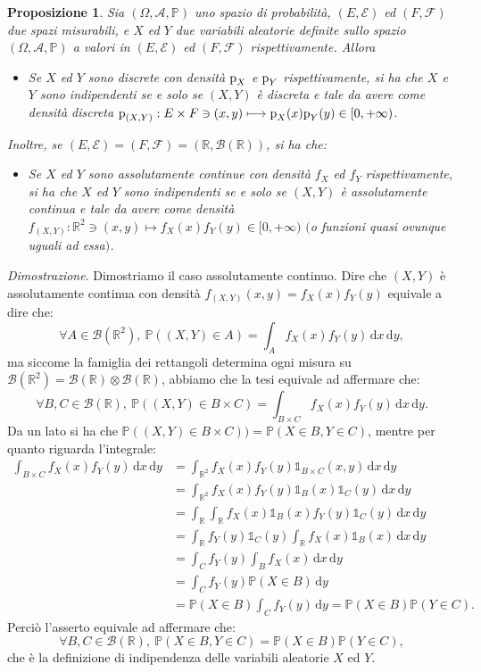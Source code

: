 \documentclass[11pt]{book}
\makeatletter
\theoremstyle{Definizione}
\theoremstyle{TeoremaProposizioneLemmaCorollario}
\newtheorem{mypropo}[myteo]{Proposizione}
\theoremstyle{OsservazioneNota}
\renewenvironment{proof}[1][\proofname]{\par
  \normalfont \topsep6\p@\@plus6\p@\relax
  \trivlist
  \item[\hskip\labelsep
        \itshape
    #1\@addpunct{.}]\ignorespaces
}{%
  \endtrivlist\@endpefalse
}
\newcommand{\R}{\mathbb{R}}
\renewcommand{\P}{\mathbb{P}}
\renewcommand{\d}{\mathrm{d}}
\newcommand{\dx}{\,\d x}
\newcommand{\dy}{\,\d y}
\newcommand{\p}{\textup{p}}
\newcommand{\uno}[1]{\mathds{1}_{#1}}
\renewenvironment{proof}{\textsl{Dimostrazione}.}{}
\makeatother
\begin{document}
\begin{boxpro}
\begin{mypropo}\label{pro:IndipendenzaAssContDiscrDistrCongiunta}
Sia $(\Omega,\mathcal{A},\P)$ uno spazio di probabilità, $(E,\mathcal{E})$ ed $(F,\mathcal{F})$ due spazi misurabili, e $X$ ed $Y$ due variabili aleatorie definite sullo spazio $(\Omega,\mathcal{A},\P)$ a valori in $(E,\mathcal{E})$ ed $(F,\mathcal{F})$ rispettivamente. Allora
\begin{itemize}
\item[$(i)$] Se $X$ ed $Y$ sono discrete con densità $\p_X$ e $\p_Y$ rispettivamente, si ha che $X$ e $Y$ sono indipendenti se e solo se $(X,Y)$ è discreta e tale da avere come densità discreta $\p_{(X,Y)}:E\times F \ni (x,y) \longmapsto \p_X(x)\p_Y(y)\in [0,+\infty)$.
\end{itemize}
Inoltre, se $(E,\mathcal{E}) = (F,\mathcal{F}) = (\R,\mathcal{B}(\R))$, si ha che:
\begin{itemize}
\item[$(ii)$] Se $X$ ed $Y$ sono assolutamente continue con densità $f_X$ ed $f_Y$ rispettivamente, si ha che $X$ ed $Y$ sono indipendenti se e solo se $(X,Y)$ è assolutamente continua e tale da avere come densità $f_{(X,Y)}:\R^2\ni (x,y)\longmapsto f_X(x)f_Y(y)\in [0,+\infty)$ $($o funzioni quasi ovunque uguali ad essa$)$.
\end{itemize}
\end{mypropo}
\tcblower
\begin{proof}
Dimostriamo il caso assolutamente continuo. Dire che $(X,Y)$ è assolutamente continua con densità $f_{(X,Y)}(x,y) = f_X(x)f_Y(y)$ equivale a dire che:
$$
\forall A \in \mathcal{B}(\R^2),\ \P((X,Y)\in A) = \int_A f_X(x)f_Y(y)\dx\dy,
$$
ma siccome la famiglia dei rettangoli determina ogni misura su $\mathcal{B}(\R^2) = \mathcal{B}(\R)\otimes \mathcal{B}(\R)$, abbiamo che la tesi equivale ad affermare che:
$$
\forall B,C\in \mathcal{B}(\R),\ \P((X,Y)\in B\times C) = \int_{B\times C} f_X(x)f_Y(y)\dx\dy.
$$
Da un lato si ha che $\P((X,Y)\in B\times C)) = \P(X\in B,Y\in C)$, mentre per quanto riguarda l'integrale:
\begin{align*}
\int_{B\times C} f_X(x)f_Y(y)\dx\dy &= \int_{\R^2} f_X(x)f_Y(y)\uno{B\times C}(x,y)\dx\dy\\
&= \int_{\R^2} f_X(x)f_Y(y)\uno{B}(x)\uno{C}(y)\dx\dy \\
&= \int_\R \int_\R f_X(x)\uno{B}(x)f_Y(y)\uno{C}(y)\dx\dy\\
&= \int_\R f_Y(y)\uno{C}(y)\int_\R f_X(x)\uno{B}(x)\dx\dy\\
&= \int_C f_Y(y) \int_B f_X(x)\dx\dy \\
&= \int_C f_Y(y)\P(X\in B)\dy \\
&= \P(X\in B)\int_C f_Y(y)\dy = \P(X\in B)\P(Y\in C).
\end{align*}
Perciò l'asserto equivale ad affermare che:
$$
\forall B,C\in \mathcal{B}(\R),\ \P(X\in B, Y\in C) = \P(X\in B)\P(Y\in C),
$$
che è la definizione di indipendenza delle variabili aleatorie $X$ ed $Y$.
\end{proof}
\end{boxpro}
\end{document}
